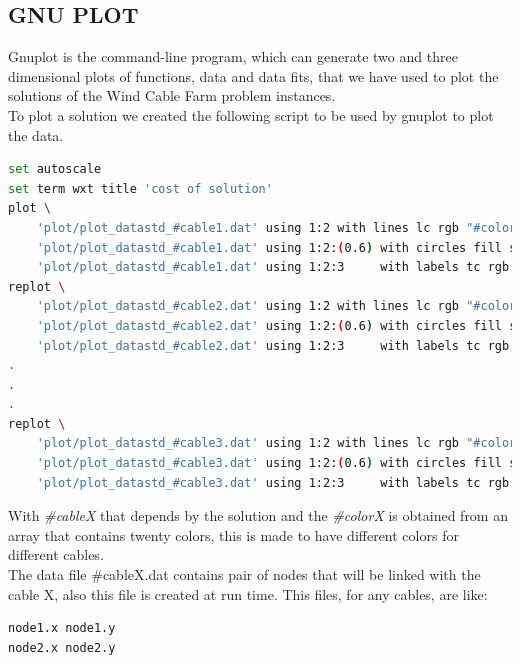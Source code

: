 \begin{appendices}
\chapter{GNU PLOT}
Gnuplot is the command-line program, which can generate two and three dimensional plots of functions, data and data fits, that we have used to plot the solutions of the Wind Cable Farm problem instances.\\
To plot a solution we created the following script to be used by gnuplot to plot the data.\\
\begin{lstlisting}[language=bash,caption={Gnuplot script}]
set autoscale
set term wxt title 'cost of solution'
plot \
	'plot/plot_datastd_#cable1.dat' using 1:2 with lines lc rgb "#color1" lw 2 title "Cable 1",\
	'plot/plot_datastd_#cable1.dat' using 1:2:(0.6) with circles fill solid lc rgb "black" notitle,\
	'plot/plot_datastd_#cable1.dat' using 1:2:3     with labels tc rgb "black" offset (0,0) font 'Arial Bold' notitle
replot \
	'plot/plot_datastd_#cable2.dat' using 1:2 with lines lc rgb "#color2" lw 2 title "Cable 2",\
	'plot/plot_datastd_#cable2.dat' using 1:2:(0.6) with circles fill solid lc rgb "black" notitle,\
	'plot/plot_datastd_#cable2.dat' using 1:2:3     with labels tc rgb "black" offset (0,0) font 'Arial Bold' notitle
.
.
.
replot \
	'plot/plot_datastd_#cable3.dat' using 1:2 with lines lc rgb "#color3" lw 2 title "Cable 3",\
	'plot/plot_datastd_#cable3.dat' using 1:2:(0.6) with circles fill solid lc rgb "black" notitle,\
	'plot/plot_datastd_#cable3.dat' using 1:2:3     with labels tc rgb "black" offset (0,0) font 'Arial Bold' notitle

\end{lstlisting}
With \textit{\#cableX} that depends by the solution and the \textit{\#colorX } is obtained from an array that contains twenty colors, this is made to have different colors for different cables.\\
The data file \#cableX.dat contains pair of nodes that will be linked with the cable X, also this file is created at run time. This files, for any cables, are like:
\newpage
\begin{lstlisting}[language=bash,caption={Data file containing cables}]
node1.x	node1.y
node2.x	node2.y


\end{lstlisting}
\end{appendices}
